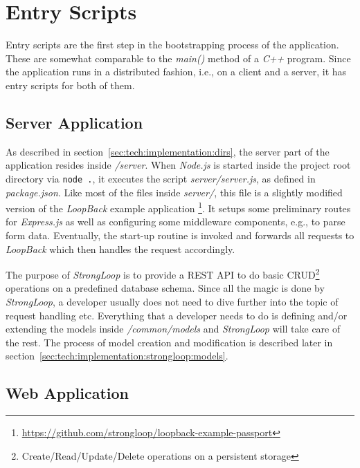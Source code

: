 \documentclass[nochapterpage,nopartpage,noheadingspace,numbersubsubsec,bigchapter,colorback,accentcolor=tud9c,10pt]{tudreport}
\begin{document}
  \section{Entry Scripts}
  \label{sec:tech:implementation:bootstrapping}

    Entry scripts are the first step in the bootstrapping process of the application. These are somewhat comparable to the \emph{main()} method of a \emph{C++} program. Since the application runs in a distributed fashion, i.e., on a client and a server, it has entry scripts for both of them.

  \subsection{Server Application}
  \label{sec:tech:implementation:bootstrapping:server}

    As described in section~\ref{sec:tech:implementation:dirs}, the server part of the application resides inside \emph{/server}. When \emph{Node.js} is started inside the project root directory via \texttt{node .}, it executes the script \emph{server/server.js}, as defined in \emph{package.json}. Like most of the files inside \emph{server/}, this file is a slightly modified version of the \emph{LoopBack} example application%
    \footnote{\url{https://github.com/strongloop/loopback-example-passport}}. It setups some preliminary routes for \emph{Express.js} as well as configuring some middleware components, e.g., to parse form data. Eventually, the start-up routine is invoked and forwards all requests to \emph{LoopBack} which then handles the request accordingly.

    The purpose of \emph{StrongLoop} is to provide a REST API to do basic CRUD\footnote{Create/Read/Update/Delete operations on a persistent storage} operations on a predefined database schema. Since all the magic is done by \emph{StrongLoop}, a developer usually does not need to dive further into the topic of request handling etc. Everything that a developer needs to do is defining and/or extending the models inside \emph{/common/models} and \emph{StrongLoop} will take care of the rest. The process of model creation and modification is described later in section~\ref{sec:tech:implementation:strongloop:models}.

  \subsection{Web Application}
  \label{sec:tech:implementation:bootstrapping:web}
\end{document}
